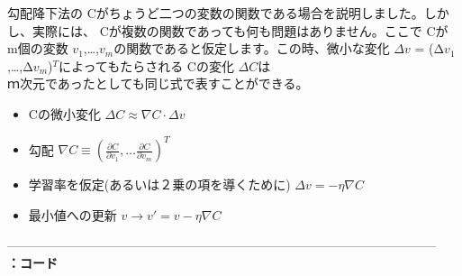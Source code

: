 \documentclass[11pt,a4j,fleqn]{jarticle}
\newcounter{apart}
\begin{document}
勾配降下法の Cがちょうど二つの変数の関数である場合を説明しました。しかし、実際には、 Cが複数の関数であっても何も問題はありません。ここで Cが m個の変数 $v_1$,…,$v_m$の関数であると仮定します。この時、微小な変化 $\Delta v$ = (Δ$v_1$,…,Δ$v_m$)$^T$によってもたらされる Cの変化 $\Delta C$は\\
ｍ次元であったとしても同じ式で表すことができる。\\
\begin{itemize}
 \item  Cの微小変化\hspace{0.5cm} $ \Delta C \approx \nabla C \cdot \Delta v$
 \item  勾配 \hspace{0.5cm}  $\nabla C \equiv \left(\frac{\partial C}{\partial v_1}, \ldots \frac{\partial C}{\partial v_m}\right)^T$
 \item  学習率を仮定(あるいは２乗の項を導くために) \hspace{0.5cm} $\Delta v = -\eta \nabla C$
 \item  最小値への更新\hspace{0.5cm} $v \rightarrow v' = v-\eta \nabla C$
\end{itemize}
------------------------------------------------------------------------------------------------------\\
\newpage
\textbf{\Large \theapart ：コード}
\end{document}
